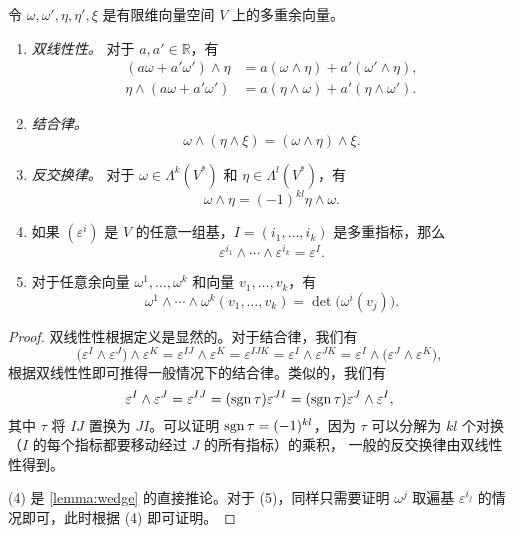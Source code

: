 \begin{proposition}[楔积的性质]\label{prop:property of wedge}
  令 $\omega,\omega',\eta,\eta',\xi$ 是有限维向量空间 $V$ 上的多重余向量。
  \begin{enumerate}
    \item \emph{双线性性。} 对于 $a,a'\in \mathbb{R}$，有
    \begin{align*}
      (a\omega+a'\omega')\wedge\eta&=a(\omega\wedge\eta)+a'(\omega'\wedge\eta),\\
      \eta\wedge(a\omega+a'\omega')&=a(\eta\wedge\omega)+a'(\eta\wedge\omega').
    \end{align*}
    \item \emph{结合律。}
    \[
      \omega\wedge(\eta\wedge\xi)=(\omega\wedge\eta)\wedge\xi.  
    \]
    \item \emph{反交换律。} 对于 $\omega\in\Lambda^k(V^*)$ 和
    $\eta\in\Lambda^l(V^*)$，有
    \begin{equation}
      \omega\wedge\eta=(-1)^{kl}\eta\wedge\omega.
    \end{equation}
    \item 如果 $(\varepsilon^i)$ 是 $V$ 的任意一组基，$I=(i_1,\dots,i_k)$
    是多重指标，那么
    \begin{equation}
      \varepsilon^{i_1} \wedge\cdots\wedge\varepsilon^{i_k}=\varepsilon^I. 
    \end{equation}
    \item 对于任意余向量 $\omega^1,\dots,\omega^k$ 和向量 $v_1,\dots,v_k$，有
    \begin{equation}
      \omega^1\wedge\cdots\wedge\omega^k(v_1,\dots,v_k)
      =\det\bigl(\omega^i(v_j)\bigr).
    \end{equation}
  \end{enumerate} 
\end{proposition}
\begin{proof}
  双线性性根据定义是显然的。对于结合律，我们有
  \[
    \bigl(\varepsilon^I\wedge\varepsilon^J\bigr)\wedge\varepsilon^K
    =\varepsilon^{IJ}\wedge \varepsilon^K
    =\varepsilon^{IJK}=\varepsilon^I\wedge\varepsilon^{JK}
    =\varepsilon^I\wedge\bigl(\varepsilon^J\wedge\varepsilon^K\bigr),
  \]
  根据双线性性即可推得一般情况下的结合律。类似的，我们有
  \[
    \varepsilon^{I}\wedge\varepsilon^J=\varepsilon^{IJ}
    =(\operatorname{sgn}\tau)\varepsilon^{JI}=(\operatorname{sgn}\tau)\varepsilon^J\wedge\varepsilon^I,  
  \]
  其中 $\tau$ 将 $IJ$ 置换为 $JI$。可以证明 $\operatorname{sgn}\tau=(-1)^{kl}$，因为
  $\tau$ 可以分解为 $kl$ 个对换（$I$ 的每个指标都要移动经过 $J$ 的所有指标）的乘积，
  一般的反交换律由双线性性得到。

  (4) 是 \autoref{lemma:wedge} 的直接推论。对于 (5)，同样只需要证明
  $\omega^j$ 取遍基 $\varepsilon^{i_j}$ 的情况即可，此时根据 (4) 即可证明。
\end{proof}

